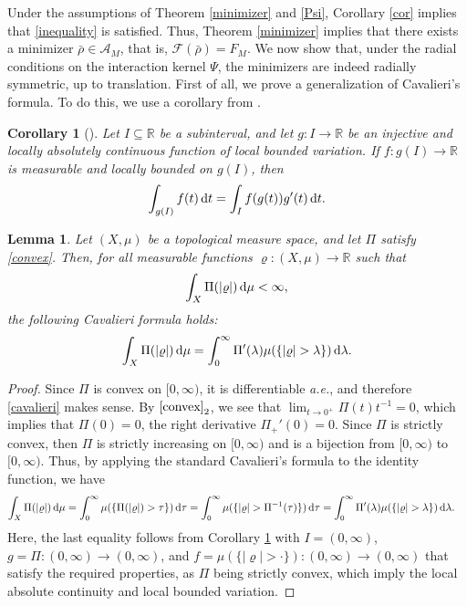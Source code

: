 \documentclass[reqno,11pt]{amsart}
\numberwithin{equation}{section}
\newtheorem{corollary}[theorem]{Corollary}
\newtheorem{lemma}[theorem]{Lemma}
\theoremstyle{definition}
\def\dd{{\, \rm d}}
\begin{document}
Under the assumptions of Theorem \ref{minimizer} and \eqref{Psi}, Corollary \ref{cor} implies that \eqref{inequality} is satisfied. Thus, Theorem \ref{minimizer} implies that there exists 
a minimizer $\bar{\rho} \in \mathcal{A}_M$, that is, $\mathcal{F}(\bar{\rho}) = F_M$. 
We now show that, under the radial conditions on the interaction kernel $\Psi$, 
the minimizers are indeed radially symmetric, up to translation. 
First of all, we prove a generalization of Cavalieri's formula. 
To do this, we use a corollary from \cite{Serrin_1969}.

\begin{corollary}
[]
\label{change}
Let $I \subseteq \mathbb{R}$ be a subinterval, and 
let $g:I \to \mathbb{R}$ be an injective and locally absolutely continuous function of
local bounded variation.  
If $f: g(I) \to \mathbb{R}$ is measurable and locally bounded on $g(I)$, then 
    \begin{equation*}
   \int_{g(I)} f(t) \dd t = \int_I f(g(t)) g'(t) \dd t.
    \end{equation*}
\end{corollary}


\begin{lemma}
    Let $(X,\mu)$ be a topological measure space, and let $\Pi$ satisfy \eqref{convex}. 
    Then, for all measurable functions $\varrho: (X,\mu) \to \mathbb{R}$ such that
    \begin{equation*}
  \int_X \Pi(|\varrho|) \dd \mu < \infty,
    \end{equation*}
the following Cavalieri formula holds{\rm:}
    \begin{equation}\label{cavalieri}
\int_X \Pi(|\varrho|) \dd \mu = \int^\infty_0 \Pi'(\lambda) \mu(\{ |\varrho| > \lambda \}) \dd \lambda.
    \end{equation}
\end{lemma}

\begin{proof}
Since $\Pi$ is convex on $[0,\infty)$, it is differentiable {\it a.e.}, and therefore \eqref{cavalieri} makes sense. By $\eqref{convex}_2$, we see that $\lim_{t \to 0^+} \Pi(t)t^{-1} = 0$, 
which implies that $\Pi(0) = 0$, the right derivative $\Pi_+'(0) = 0$.
Since $\Pi$ is strictly convex, then $\Pi$ is strictly increasing on $[0,\infty)$ 
and is a bijection from $[0,\infty)$ to $[0,\infty)$. 
Thus, by applying the standard Cavalieri's formula to the identity function, we have
\begin{align*}
\int_X \Pi(|\varrho|) \dd \mu & = \int^\infty_0 \mu(\{ \Pi(|\varrho|) > \tau \}) \dd \tau = \int^\infty_0 \mu(\{ |\varrho| > \Pi^{-1}(\tau) \}) \dd \tau  = \int^\infty_0 \Pi'(\lambda) \mu(\{ |\varrho| > \lambda \}) \dd \lambda.
\end{align*}
Here, the last equality follows from Corollary \ref{change} with $I = (0,\infty)$, 
$g = \Pi: (0,\infty) \to (0,\infty)$, and $f = \mu(\{ |\varrho| > \cdot \}): (0,\infty) \to (0,\infty)$
that satisfy the required properties, as $\Pi$ being strictly convex, which imply
the local absolute continuity and local bounded variation.
\end{proof}
\end{document}
